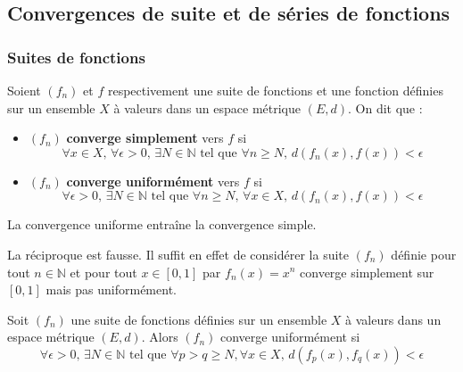 




  \subsection{Convergences de suite et de séries de fonctions}

  \subsubsection{Suites de fonctions}


  \begin{definition}
    Soient $(f_n)$ et $f$ respectivement une suite de fonctions et une fonction définies sur un ensemble $X$ à valeurs dans un espace métrique $(E, d)$. On dit que :
    \begin{itemize}
      \item $(f_n)$ \textbf{converge simplement} vers $f$ si
      \[ \forall x \in X, \, \forall \epsilon > 0, \, \exists N \in \mathbb{N} \text{ tel que } \forall n \geq N, \, d(f_n(x), f(x)) < \epsilon \]
      \item $(f_n)$ \textbf{converge uniformément} vers $f$ si
      \[ \forall \epsilon > 0, \, \exists N \in \mathbb{N} \text{ tel que } \forall n \geq N, \, \forall x \in X, \, d(f_n(x), f(x)) < \epsilon \]
    \end{itemize}
  \end{definition}

  \begin{proposition}
    La convergence uniforme entraîne la convergence simple.
  \end{proposition}

  \begin{cexample}
    La réciproque est fausse. Il suffit en effet de considérer la suite $(f_n)$ définie pour tout $n \in \mathbb{N}$ et pour tout $x \in [0,1]$ par $f_n(x) = x^n$ converge simplement sur $[0,1]$ mais pas uniformément.
  \end{cexample}

  \begin{theorem}
    Soit $(f_n)$ une suite de fonctions définies sur un ensemble $X$ à valeurs dans un espace métrique $(E, d)$. Alors $(f_n)$ converge uniformément si
    \[ \forall \epsilon > 0, \, \exists N \in \mathbb{N} \text{ tel que } \forall p > q \geq N, \forall x \in X, \, d(f_p(x), f_q(x)) < \epsilon \]
  \end{theorem}

